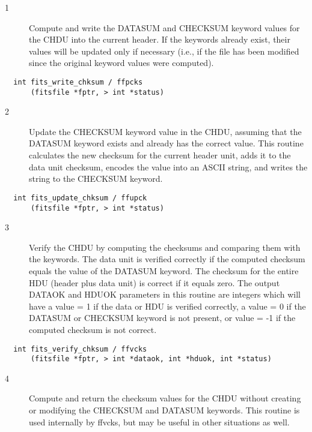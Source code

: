 \documentclass[11pt]{book}
\begin{document}
\begin{description}
\item[1 ] Compute and write the DATASUM and CHECKSUM keyword values for the CHDU
    into the current header.  If the keywords already exist, their values
    will be updated only if necessary (i.e., if the file
    has been modified since the original keyword
   values were computed). \label{ffpcks}
\end{description}

\begin{verbatim}
  int fits_write_chksum / ffpcks
      (fitsfile *fptr, > int *status)
\end{verbatim}

\begin{description}
\item[2 ] Update the CHECKSUM keyword value in the CHDU, assuming that the
    DATASUM keyword exists and already has the correct value.  This routine
    calculates the new checksum for the current header unit, adds it to the
    data unit checksum, encodes the value into an ASCII string, and writes
   the string to the CHECKSUM keyword. \label{ffupck}
\end{description}

\begin{verbatim}
  int fits_update_chksum / ffupck
      (fitsfile *fptr, > int *status)
\end{verbatim}

\begin{description}
\item[3 ] Verify the CHDU by computing the checksums and comparing
    them with the keywords.  The data unit is verified correctly
    if the computed checksum equals the value of the DATASUM
    keyword.  The checksum for the entire HDU (header plus data unit) is
    correct if it equals zero.  The output DATAOK and HDUOK parameters
    in this routine are integers which will have a value = 1
    if the data or HDU is verified correctly, a value = 0
    if the DATASUM or CHECKSUM keyword is not present, or value = -1
   if the computed checksum is not correct. \label{ffvcks}
\end{description}

\begin{verbatim}
  int fits_verify_chksum / ffvcks
      (fitsfile *fptr, > int *dataok, int *hduok, int *status)
\end{verbatim}

\begin{description}
\item[4 ] Compute and return the checksum values for the CHDU
    without creating or modifying the
    CHECKSUM and DATASUM keywords.  This routine is used internally by
   ffvcks, but may be useful in other situations as well. \label{ffgcks}
\end{description}
\end{document}
